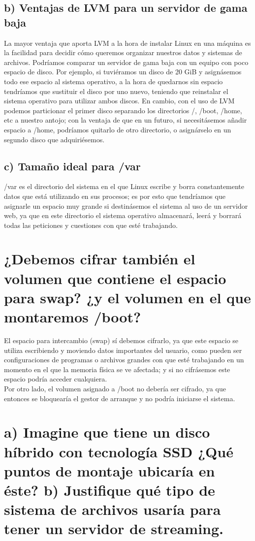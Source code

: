 \subsection{b) Ventajas de LVM para un servidor de gama baja}
La mayor ventaja que aporta LVM a la hora de instalar Linux en una máquina es la facilidad para decidir cómo queremos organizar
nuestros datos y sistemas de archivos. Podríamos comparar un servidor de gama baja con un equipo con poco espacio de disco. Por ejemplo,
si tuviéramos un disco de 20 GiB y asignásemos todo ese espacio al sistema operativo, a la hora de quedarnos sin espacio tendríamos que
sustituir el disco por uno nuevo, teniendo que reinstalar el sistema operativo para utilizar ambos discos. En cambio, con el uso de LVM
podemos particionar el primer disco separando los directorios /, /boot, /home, etc a nuestro antojo; con la ventaja de que en un futuro,
si necesitásemos añadir espacio a /home, podríamos quitarlo de otro directorio, o asignárselo en un segundo disco que adquiriésemos.

\subsection{c) Tamaño ideal para /var}
/var es el directorio del sistema en el que Linux escribe y borra constantemente datos que está utilizando en sus procesos; es por esto
que tendríamos que asignarle un espacio muy grande si destinásemos el sistema al uso de un servidor web, ya que en este directorio el sistema
operativo almacenará, leerá y borrará todas las peticiones y cuestiones con que esté trabajando.


\section{¿Debemos cifrar también el volumen que contiene el espacio para swap? ¿y el volumen en el que montaremos /boot?}
El espacio para intercambio (swap) sí debemos cifrarlo, ya que este espacio se utiliza escribiendo y moviendo datos importantes
del usuario, como pueden ser configuraciones de programas o archivos grandes con que esté trabajando en un momento en el que la memoria
física se ve afectada; y si no cifrásemos este espacio podría acceder cualquiera. \\
Por otro lado, el volumen asignado a /boot no debería ser cifrado, ya que entonces se bloquearía el gestor de arranque y no podría
iniciarse el sistema.


\section{a) Imagine que tiene un disco híbrido con tecnología SSD ¿Qué puntos de montaje ubicaría en éste? b) Justifique qué
tipo de sistema de archivos usaría para tener un servidor de streaming.}

